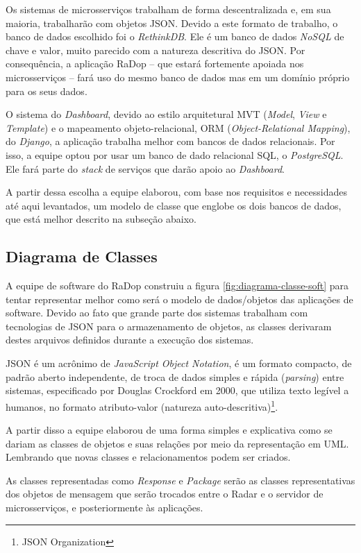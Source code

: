 Os sistemas de microsserviços trabalham de forma descentralizada e, em sua maioria, trabalharão com objetos JSON. Devido a este formato de trabalho, o banco de dados escolhido foi o \textit{RethinkDB}. Ele é um banco de dados \textit{NoSQL} de chave e valor, muito parecido com a natureza descritiva do JSON. Por consequência, a aplicação RaDop -- que estará fortemente apoiada nos microsserviços -- fará uso do mesmo banco de dados mas em um domínio próprio para os seus dados.

O sistema do \textit{Dashboard}, devido ao estilo arquitetural MVT (\textit{Model}, \textit{View} e \textit{Template}) e o mapeamento objeto-relacional, ORM (\textit{Object-Relational Mapping}), do \textit{Django}, a aplicação trabalha melhor com bancos de dados relacionais. Por isso, a equipe optou por usar um banco de dado relacional SQL, o \textit{PostgreSQL}. Ele fará parte do \textit{stack} de serviços que darão apoio ao \textit{Dashboard}.

A partir dessa escolha a equipe elaborou, com base nos requisitos e necessidades até aqui levantados, um modelo de classe que englobe os dois bancos de dados, que está melhor descrito na subseção abaixo.

\subsection{Diagrama de Classes}

A equipe de software do RaDop construiu a figura \ref{fig:diagrama-classe-soft} para tentar representar melhor como será o modelo de dados/objetos das aplicações de software. Devido ao fato que grande parte dos sistemas trabalham com tecnologias de JSON para o armazenamento de objetos, as classes derivaram destes arquivos definidos durante a execução dos sistemas.

JSON é um acrônimo de \textit{JavaScript Object Notation}, é um formato compacto, de padrão aberto independente, de troca de dados simples e rápida (\textit{parsing}) entre sistemas, especificado por Douglas Crockford em 2000, que utiliza texto legível a humanos, no formato atributo-valor (natureza auto-descritiva)\footnote{JSON Organization}.

A partir disso a equipe elaborou de uma forma simples e explicativa como se dariam as classes de objetos e suas relações por meio da representação em UML. Lembrando que novas classes e relacionamentos podem ser criados.

As classes representadas como \textit{Response} e \textit{Package} serão as classes representativas dos objetos de mensagem que serão trocados entre o Radar e o servidor de microsserviços, e posteriormente às aplicações.


